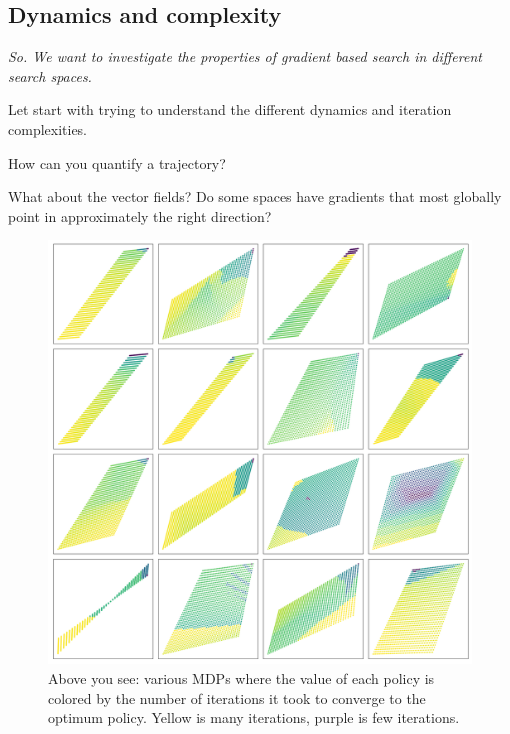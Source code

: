 \subsection{Dynamics and complexity}

\begin{displayquote}
  \textit{So. We want to investigate the properties of gradient based search in different search spaces.}
\end{displayquote}

Let start with trying to understand the different dynamics and iteration complexities.

How can you quantify a trajectory?

What about the vector fields?
Do some spaces have gradients that most globally point in approximately the right direction?



\begin{figure}
\centering
\includegraphics[width=1\textwidth,height=1\textheight]{../../pictures/figures/mvi-iterations.png}
\caption{Above you see: various MDPs where the value of each policy is colored
by the number of iterations it took to converge to the optimum policy. Yellow is many iterations, purple is few iterations.}
\end{figure}

